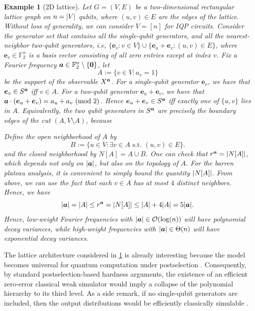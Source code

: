 \documentclass{article}
\theoremstyle{plain}
\newtheorem{example}[theorem]{Example}
\theoremstyle{definition}
\theoremstyle{remark}
\begin{document}
\begin{example}[2D lattice]
\label{eg:lattice}
Let $G=(V,E)$ be a two-dimensional rectangular lattice graph on $n=\abs{V}$ qubits, where $(u,v)\in E$ are the edges of the lattice. Without loss of generality, we can consider $V = [n]$ for IQP circuits. Consider the generator set that contains all the single-qubit generators, and all the nearest-neighbor two-qubit generators, i.e, $\{\bm{e}_v : v\in V\} \cup \{\bm{e}_u+\bm{e}_v : (u,v)\in E\}$, where $\bm{e}_v\in \mathbb{F}_2^n$ is a basis vector consisting of all zero entries except at index $v$. Fix a Fourier frequency ${\bm{a}} \in \mathbb{F}_2^n \setminus \{\bm{0}\}$, let
\begin{equation*}
    A:=\{v\in V: a_v=1\}
\end{equation*}
be the support of the observable $X^{\bm{a}}$. For a single-qubit generator $\bm{e}_v$, we have that $\bm{e}_v\in S^{\bm{a}}$ iff $v\in A$. For a two-qubit generator $\bm{e}_u+\bm{e}_v$, we have that ${\bm{a}} \cdot (\bm{e}_u+\bm{e}_v)=a_u+a_v\ (\mathrm{mod}\ 2)$. Hence $\bm{e}_u+\bm{e}_v\in S^{\bm{a}}$ iff exactly one of $\{u,v\}$ lies in $A$. Equivalently, the two qubit generators in $S^{\bm{a}}$ are precisely the boundary edges of the cut $(A, V\setminus A)$, because 

Define the open neighborhood of $A$ by
\begin{equation}
B := \{u\in V: \exists v\in A  \text{ s.t. } (u,v)\in E\}.
\end{equation} and the closed neighborhood by $N[A] = A \cup B$. 
One can check that $r^{\bm{a}} = \abs{N[A]}$, which depends not only on $\abs{{\bm{a}}}$, but also on the topology of $A$. For the barren plateau analysis, it is convenient to simply bound the quantity $\abs{N[A]}$.
From above, we can use the fact that each $v\in A$ has at most $4$ distinct neighbors. Hence, we have
\begin{equation}
\abs{{\bm{a}}}=\abs{A} \leq  r^{\bm{a}}=\abs{N[A]} \leq \abs{A}+4\abs{A} = 5\abs{{\bm{a}}}.
\end{equation}
Hence, low-weight Fourier frequencies with $\abs{{\bm{a}}} \in \mathcal{O}(\log(n))$ will have polynomial decay variances, while high-weight frequencies with $\abs{{\bm{a}}} \in \Theta(n)$ will have exponential decay variances.
\end{example}
The lattice architecture considered in \cref{eg:lattice} is already interesting because the model becomes universal for quantum computation under postselection \cite{Fujii17}. Consequently, by standard postselection-based hardness arguments, the existence of an efficient zero-error classical weak simulator would imply a collapse of the polynomial hierarchy to its third level. As a side remark, if no single-qubit generators are included, then the output distributions would be efficiently classically simulable \cite{Fujii17}.
\end{document}
